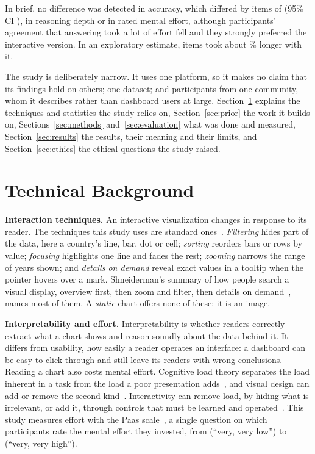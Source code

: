 \documentclass[10pt,twocolumn]{article}
\begin{document}
In brief, no difference was detected in accuracy, which differed by  items of  (95\% CI ), in reasoning depth or in rated mental effort, although participants' agreement that answering took a lot of effort fell and they strongly preferred the interactive version. In an exploratory estimate, items took about \% longer with it.

The study is deliberately narrow. It uses one platform, so it makes no claim that its findings hold on others; one dataset; and  participants from one community, whom it describes rather than dashboard users at large. Section~\ref{sec:background} explains the techniques and statistics the study relies on, Section~\ref{sec:prior} the work it builds on, Sections~\ref{sec:methods} and~\ref{sec:evaluation} what was done and measured, Section~\ref{sec:results} the results, their meaning and their limits, and Section~\ref{sec:ethics} the ethical questions the study raised.

\section{Technical Background}
\label{sec:background}

\textbf{Interaction techniques.} An interactive visualization changes in response to its reader. The techniques this study uses are standard ones~\cite{yi2007,munzner2014}. \emph{Filtering} hides part of the data, here a country's line, bar, dot or cell; \emph{sorting} reorders bars or rows by value; \emph{focusing} highlights one line and fades the rest; \emph{zooming} narrows the range of years shown; and \emph{details on demand} reveal exact values in a tooltip when the pointer hovers over a mark. Shneiderman's summary of how people search a visual display, overview first, then zoom and filter, then details on demand~\cite{shneiderman1996}, names most of them. A \emph{static} chart offers none of these: it is an image.

\textbf{Interpretability and effort.} Interpretability is whether readers correctly extract what a chart shows and reason soundly about the data behind it. It differs from usability, how easily a reader operates an interface: a dashboard can be easy to click through and still leave its readers with wrong conclusions. Reading a chart also costs mental effort. Cognitive load theory separates the load inherent in a task from the load a poor presentation adds~\cite{castroalonso2019}, and visual design can add or remove the second kind~\cite{ware2000}. Interactivity can remove load, by hiding what is irrelevant, or add it, through controls that must be learned and operated~\cite{lam2008}. This study measures effort with the Paas scale~\cite{paas1992}, a single question on which participants rate the mental effort they invested, from  (``very, very low'') to  (``very, very high'').
\end{document}
